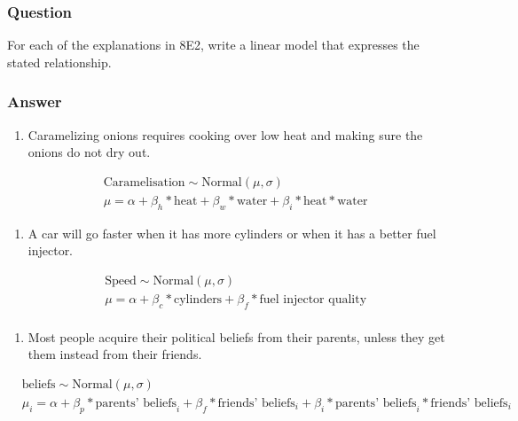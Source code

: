 \documentclass[
]{book}
\providecommand{\tightlist}{%
  \setlength{\itemsep}{0pt}\setlength{\parskip}{0pt}}
\begin{document}
\hypertarget{question-77}{%
\subsubsection*{Question}\label{question-77}}

For each of the explanations in 8E2, write a linear model that expresses the stated relationship.

\hypertarget{answer-77}{%
\subsubsection*{Answer}\label{answer-77}}

\begin{enumerate}
\def\labelenumi{\arabic{enumi}.}
\tightlist
\item
  Caramelizing onions requires cooking over low heat and making sure the onions do not dry out.
\end{enumerate}

\[
\begin{aligned}
&\text{Caramelisation} \sim \text{Normal}(\mu,\sigma) \\
&\mu = \alpha + \beta_{h} * \text{heat} + \beta_w * \text{water} + \beta_i * \text{heat}*\text{water} 
\end{aligned}
\]

\begin{enumerate}
\def\labelenumi{\arabic{enumi}.}
\setcounter{enumi}{1}
\tightlist
\item
  A car will go faster when it has more cylinders or when it has a better fuel injector.
\end{enumerate}

\[
\begin{aligned}
&\text{Speed} \sim \text{Normal}(\mu,\sigma) \\
&\mu = \alpha + \beta_{c} * \text{cylinders} + \beta_f * \text{fuel injector quality}  \\
\end{aligned}
\]

\begin{enumerate}
\def\labelenumi{\arabic{enumi}.}
\setcounter{enumi}{2}
\tightlist
\item
  Most people acquire their political beliefs from their parents, unless they get them instead from their friends.
\end{enumerate}

\[
\begin{aligned}
&\text{beliefs} \sim \text{Normal}(\mu,\sigma) \\
&\mu_i = \alpha + \beta_{p} * \text{parents' beliefs}_i + \beta_f * \text{friends' beliefs}_i + \beta_i * \text{parents' beliefs}_i*\text{friends' beliefs}_i  \\
\end{aligned}
\]
\end{document}
